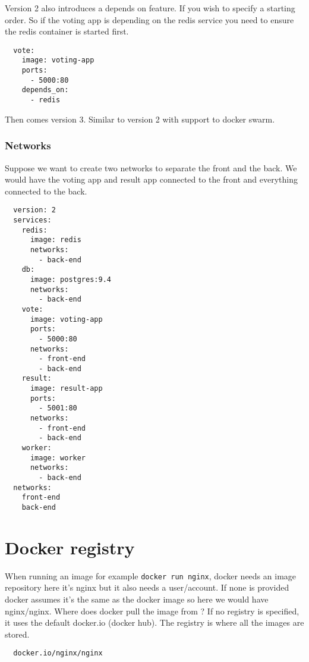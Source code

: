 \documentclass[french]{article}
\begin{document}
Version 2 also introduces a depends on feature. If you wish to specify a starting order. So if the voting app is depending on the redis service you need to ensure the redis container is started first.
\begin{verbatim}
  vote:
    image: voting-app
    ports:
      - 5000:80
    depends_on:
      - redis
\end{verbatim}

Then comes version 3. Similar to version 2 with support to docker swarm.

\subsubsection{Networks}

Suppose we want to create two networks to separate the front and the back. We would have the voting app and result app connected to the front and everything connected to the back.

\begin{verbatim}
  version: 2
  services:
    redis:
      image: redis
      networks:
        - back-end
    db:
      image: postgres:9.4
      networks:
        - back-end
    vote:
      image: voting-app
      ports:
        - 5000:80
      networks:
        - front-end
        - back-end
    result:
      image: result-app
      ports:
        - 5001:80
      networks:
        - front-end
        - back-end
    worker:
      image: worker
      networks:
        - back-end
  networks:
    front-end
    back-end
\end{verbatim}

\section{Docker registry}

When running an image for example \verb|docker run nginx|, docker needs an image repository here it's nginx but it also needs a user/account. If none is provided docker assumes it's the same as the docker image so here we would have nginx/nginx. Where does docker pull the image from ? If no registry is specified, it uses the default docker.io (docker hub). The registry is where all the images are stored.
\begin{verbatim}
  docker.io/nginx/nginx
\end{verbatim}
\end{document}
